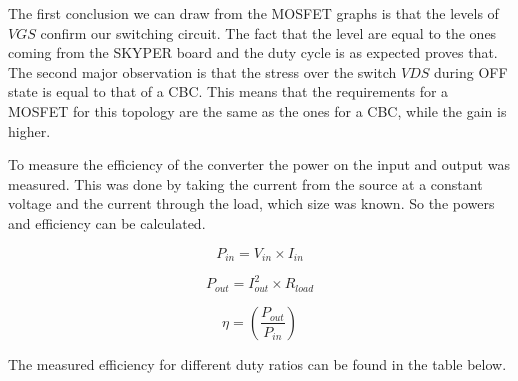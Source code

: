 The first conclusion we can draw from the MOSFET graphs is that the levels of $V{GS}$ confirm our switching circuit. 
The fact that the level are equal to the ones coming from the SKYPER board and the duty cycle is as expected proves that. 
The second major observation is that the stress over the switch $V{DS}$ during OFF state is equal to that of a CBC. 
This means that the requirements for a MOSFET for this topology are the same as the ones for a CBC, while the gain is higher.

To measure the efficiency of the converter the power on the input and output was measured.
This was done by taking the current from the source at a constant voltage and the current through the load, which size was known. So the powers and efficiency can be calculated.

\begin{equation}
	P_{in}= V_{in} \times I_{in}
	\label{eq:EfficiencyPin}
\end{equation}

\begin{equation}
	P_{out}= I_{out}^2 \times R_{load}
	\label{eq:EfficiencyPout}
\end{equation}

\begin{equation}
	\eta = (\frac{P_{out}}{P_{in}})
	\label{eq:Efficiency}
\end{equation}


The measured efficiency for different duty ratios can be found in the table below.

